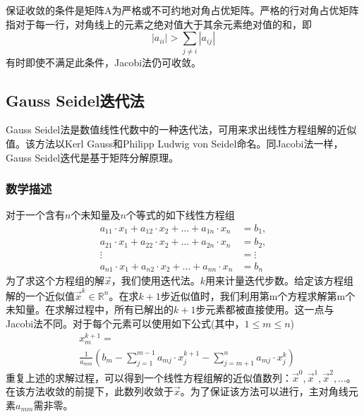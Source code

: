 \documentclass[twoside,twocolumn]{article}
\begin{document}
\begin{CJK*}{UTF8}{gkai}
	保证收敛的条件是矩阵A为严格或不可约地对角占优矩阵。严格的行对角占优矩阵指对于每一行，对角线上的元素之绝对值大于其余元素绝对值的和，即
	\begin{equation*}
	\left|a_{ii}\right|>\sum _{j\neq i}{\left|a_{ij}\right|}
	\end{equation*}
	有时即使不满足此条件，Jacobi法仍可收敛。 
	\subsection{Gauss Seidel迭代法}
	Gauss Seidel法是数值线性代数中的一种迭代法，可用来求出线性方程组解的近似值。该方法以Kerl Gauss和Philipp Ludwig von Seidel命名。同Jacobi法一样，Gauss Seidel迭代是基于矩阵分解原理。
	\subsubsection{数学描述}
	对于一个含有$n$个未知量及$n$个等式的如下线性方程组
	\begin{equation*}
	\begin{aligned}
	a_{11}\cdot x_{1}+a_{12}\cdot x_{2}+\ldots +a_{1n}\cdot x_{n}&=b_{1},\\a_{21}\cdot x_{1}+a_{22}\cdot x_{2}+\ldots +a_{2n}\cdot x_{n}&=b_{2},\\\vdots \qquad \qquad \qquad &=\vdots \\a_{n1}\cdot x_{1}+a_{n2}\cdot x_{2}+\ldots +a_{nn}\cdot x_{n}&=b_{n}
	\end{aligned}
	\end{equation*}
	为了求这个方程组的解$\vec{x}$，我们使用迭代法。$k$用来计量迭代步数。给定该方程组解的一个近似值$\vec {x}^{k}\in \mathbb {R} ^{n}$。在求$k+1$步近似值时，我们利用第m个方程求解第m个未知量。在求解过程中，所有已解出的$k+1$步元素都被直接使用。这一点与Jacobi法不同。对于每个元素可以使用如下公式(其中，$1\leq m\leq n$)
	\begin{equation*}
	\begin{aligned}
		&x_{m}^{k+1}=\\&{\frac {1}{a_{mm}}}\left(b_{m}-\sum _{j=1}^{m-1}a_{mj}\cdot x_{j}^{k+1}-\sum _{j=m+1}^{n}a_{mj}\cdot x_{j}^{k}\right)
	\end{aligned}
	\end{equation*}
	重复上述的求解过程，可以得到一个线性方程组解的近似值数列：${\vec {x}}^{0},{\vec {x}}^{1},{\vec {x}}^{2},\ldots$。在该方法收敛的前提下，此数列收敛于$\vec{x}$。为了保证该方法可以进行，主对角线元素$a_{mm}$需非零。

\end{CJK*}
\end{document}
